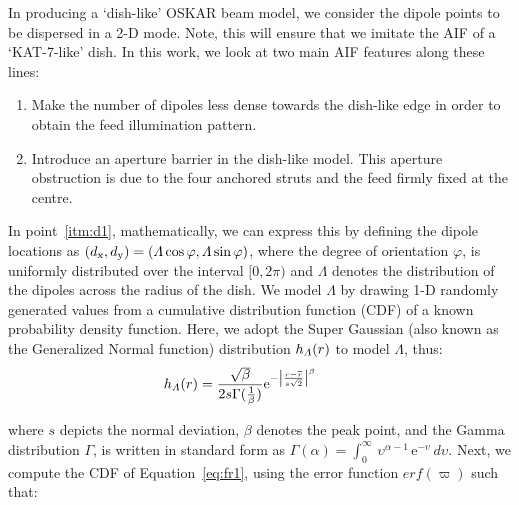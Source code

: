 In producing a \enquote*{dish-like} OSKAR beam model, we consider the dipole points to be dispersed in a 2-D mode. Note, this will ensure that we imitate the AIF of a 
\enquote*{KAT-7-like} dish. In this work, we look at two main AIF features along these lines:
\begin{enumerate}[label=(\roman*)]
 \item Make the number of dipoles less dense towards the dish-like edge in order to obtain the feed illumination pattern. \label{itm:d1}
 \item Introduce an aperture barrier in the dish-like model. This aperture obstruction is due to the four anchored struts and the feed firmly fixed at the centre.\label{itm:d2}
\end{enumerate}
\noindent In point~\ref{itm:d1}, mathematically, we can express this by defining the dipole locations as $(d_{\rm x}, d_{\rm y})  = (\varLambda\cos \varphi, \varLambda\sin \varphi)$, 
where the degree of orientation $\varphi$, is  uniformly distributed over the interval $[0, 2\pi)$ and $\varLambda$ denotes the distribution of the
dipoles across the radius of the dish. We model $\varLambda$ by drawing 1-D randomly generated values 
from a cumulative distribution function (CDF) of a known probability density function. Here, we adopt the 
Super Gaussian (also known as the Generalized Normal function) distribution $h_{\rm \varLambda}(r)$  \citep{techreport-minimal,techreport-minimal2} to model $\varLambda$,
 thus:
\begin{equation}
  \begin{aligned}
  h_{\rm \varLambda}(r) = \frac{\sqrt{\beta}}{2s \Gamma(\frac{1}{\beta})}  \mathrm{e}^{-\left|\frac{r-\overline{r}}{s\sqrt{2}}\right|^\beta}   
  \end{aligned}
  \phantom{\hspace{1cm}}
  \label{eq:fr1}
 \end{equation}
 
\noindent where $s$ depicts the normal deviation, $\beta$ denotes the peak point, 
and the Gamma distribution $\Gamma$, is written in standard form as $\Gamma(\alpha) = \int_{0}^{\infty}\, \upsilon^{\alpha-1}\, \mathrm{e}^{-\upsilon}\, d\upsilon$.
Next, we compute the CDF of Equation~\ref{eq:fr1}, using the error function $erf(\varpi)$ such that:

